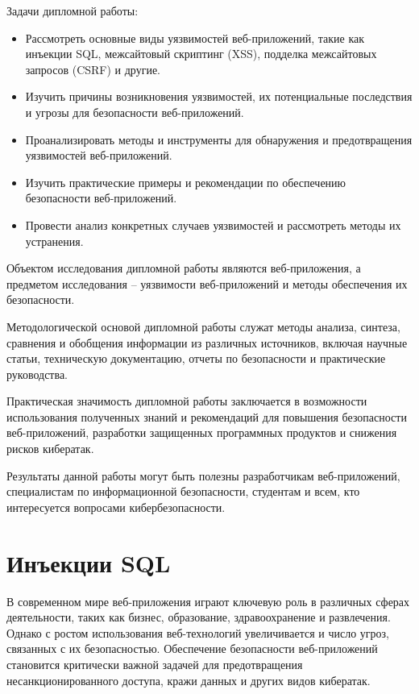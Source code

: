 \documentclass[a4paper,12pt]{diplom}
\begin{document}
	Задачи дипломной работы:
	
	\begin{itemize}
		\item Рассмотреть основные виды уязвимостей веб-приложений, такие как инъекции SQL, межсайтовый скриптинг (XSS), подделка межсайтовых запросов (CSRF) и другие.
		\item Изучить причины возникновения уязвимостей, их потенциальные последствия и угрозы для безопасности веб-приложений.
		\item Проанализировать методы и инструменты для обнаружения и предотвращения уязвимостей веб-приложений.
		\item Изучить практические примеры и рекомендации по обеспечению безопасности веб-приложений.
		\item Провести анализ конкретных случаев уязвимостей и рассмотреть методы их устранения.
	\end{itemize}
	
	Объектом исследования дипломной работы являются веб-приложения, а предметом исследования – уязвимости веб-приложений и методы обеспечения их безопасности.
	
	Методологической основой дипломной работы служат методы анализа, синтеза, сравнения и обобщения информации из различных источников, включая научные статьи, техническую документацию, отчеты по безопасности и практические руководства.
	
	Практическая значимость дипломной работы заключается в возможности использования полученных знаний и рекомендаций для повышения безопасности веб-приложений, разработки защищенных программных продуктов и снижения рисков кибератак. 
	
	Результаты данной работы могут быть полезны разработчикам веб-приложений, специалистам по информационной безопасности, студентам и всем, кто интересуется вопросами кибербезопасности.
	
	
	\chapter[Инъекции SQL]{Инъекции SQL}
	
	
	В современном мире веб-приложения играют ключевую роль в различных сферах деятельности, таких как бизнес, образование, здравоохранение и развлечения. Однако с ростом использования веб-технологий увеличивается и число угроз, связанных с их безопасностью. Обеспечение безопасности веб-приложений становится критически важной задачей для предотвращения несанкционированного доступа, кражи данных и других видов кибератак.
	
\end{document}
